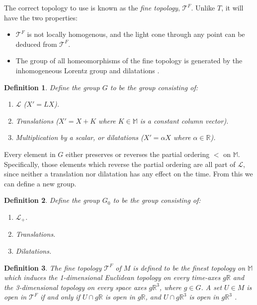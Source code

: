 \documentclass[12pt]{article}
\theoremstyle{defn}
\newtheorem{defn}{Definition}
\theoremstyle{pf}
\newcommand{\M}{\mathbb{M}}
\newcommand{\R}{\mathbb{R}}
\newcommand{\0}{\emptyset}
\renewcommand{\-}{\setminus}
\begin{document}
The correct topology to use is known as the \textit{fine topology}, $\mathcal{T}^F$. Unlike $T$, it will have the two properties:
\begin{itemize}
 \item[1*.] $\mathcal{T}^F$ is not locally homogenous, and the light cone through any point can be deduced from $\mathcal{T}^F$.
\item[2*.] The group of all homeomorphisms of the fine topology is generated by the inhomogeneous Lorentz group and dilatations \cite{zeeman}.
\end{itemize}

\begin{defn}Define the group $G$ to be the group consisting of:
 \begin{enumerate}
 \item $\mathcal{L}$ ($X'=LX$).
\item Translations ($X'=X+K$ where $K\in\M$ is a constant column vector).
\item Multiplication by a scalar, or dilatations ($X'=\alpha X$ where $\alpha\in\R$).
 \end{enumerate}
\end{defn}

Every element in $G$ either preserves or reverses the partial ordering $<$ on $\M$. Specifically, those elements which reverse the partial ordering are all part of $\mathcal{L}$, since neither a translation nor dilatation has any effect on the time. From this we can define a new group.

\begin{defn}Define the group $G_0$ to be the group consisting of:
 \begin{enumerate}
 \item $\mathcal{L}_+$.
\item Translations.
\item Dilatations.
 \end{enumerate}
\end{defn}

\begin{defn}The \textit{fine topology} $\mathcal{T}^F$ of $M$ is defined to be the finest topology on $\M$ which induces the 1-dimensional Euclidean topology on every time-axes $g\R$ and the 3-dimensional topology on every space axes $g\R^3$, where $g\in G$. A set $U\in M$ is open in $\mathcal{T}^F$ if and only if $U\cap g\R$ is open in $g\R$, and $U\cap g\R^3$ is open in $g\R^3$ \cite{zeeman}.\end{defn}
\end{document}
